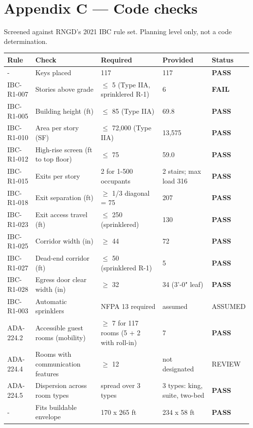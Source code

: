 \documentclass[10pt]{article}
\begin{document}
\section*{Appendix C --- Code checks}
Screened against RNGD's 2021 IBC rule set. Planning level only, not a code determination.
\begin{longtable}{p{1.8cm}p{3.8cm}p{4.1cm}p{3.2cm}p{1.4cm}}\toprule
\textbf{Rule} & \textbf{Check} & \textbf{Required} & \textbf{Provided} & \textbf{Status} \\ \midrule \endhead
- & Keys placed & 117 & 117 & \textcolor{pass}{\textbf{PASS}} \\
IBC-R1-007 & Stories above grade & $\le$ 5 (Type IIA, sprinklered R-1) & 6 & \textcolor{fail}{\textbf{FAIL}} \\
IBC-R1-005 & Building height (ft) & $\le$ 85 (Type IIA) & 69.8 & \textcolor{pass}{\textbf{PASS}} \\
IBC-R1-010 & Area per story (SF) & $\le$ 72,000 (Type IIA) & 13,575 & \textcolor{pass}{\textbf{PASS}} \\
IBC-R1-012 & High-rise screen (ft to top floor) & $\le$ 75 & 59.0 & \textcolor{pass}{\textbf{PASS}} \\
IBC-R1-015 & Exits per story & 2 for 1-500 occupants & 2 stairs; max load 316 & \textcolor{pass}{\textbf{PASS}} \\
IBC-R1-018 & Exit separation (ft) & $\ge$ 1/3 diagonal = 75 & 207 & \textcolor{pass}{\textbf{PASS}} \\
IBC-R1-023 & Exit access travel (ft) & $\le$ 250 (sprinklered) & 130 & \textcolor{pass}{\textbf{PASS}} \\
IBC-R1-025 & Corridor width (in) & $\ge$ 44 & 72 & \textcolor{pass}{\textbf{PASS}} \\
IBC-R1-027 & Dead-end corridor (ft) & $\le$ 50 (sprinklered R-1) & 5 & \textcolor{pass}{\textbf{PASS}} \\
IBC-R1-028 & Egress door clear width (in) & $\ge$ 32 & 34 (3'-0" leaf) & \textcolor{pass}{\textbf{PASS}} \\
IBC-R1-003 & Automatic sprinklers & NFPA 13 required & assumed & ASSUMED \\
ADA-224.2 & Accessible guest rooms (mobility) & $\ge$ 7 for 117 rooms (5 + 2 with roll-in) & 7 & \textcolor{pass}{\textbf{PASS}} \\
ADA-224.4 & Rooms with communication features & $\ge$ 12 & not designated & REVIEW \\
ADA-224.5 & Dispersion across room types & spread over 3 types & 3 types: king, suite, two-bed & \textcolor{pass}{\textbf{PASS}} \\
- & Fits buildable envelope & 170 x 265 ft & 234 x 58 ft & \textcolor{pass}{\textbf{PASS}} \\
\bottomrule\end{longtable}
\end{document}
